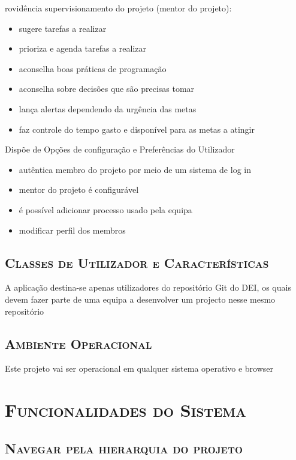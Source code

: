 \documentclass[12pt]{article}
\begin{document}
\hfill \linebreak

rovidência supervisionamento do projeto (mentor do projeto):
\begin{itemize}
\item sugere tarefas a realizar
\item prioriza e agenda tarefas a realizar
\item aconselha boas práticas de programação
\item aconselha sobre decisões que são precisas tomar
\item lança alertas dependendo da urgência das metas
\item faz controle do tempo gasto e disponível para as metas a atingir
\end{itemize}

Dispõe de Opções de configuração e Preferências do Utilizador
\begin{itemize}
\item autêntica membro do projeto por meio de um sistema de log in
\item mentor do projeto é configurável 
\item é possível adicionar processo usado pela equipa
\item modificar perfil dos membros
\end{itemize}

\subsection{ \textsc{Classes de Utilizador e Características}}
A aplicação destina-se apenas utilizadores do repositório Git do DEI, os quais devem fazer parte de uma equipa a desenvolver um projecto nesse mesmo repositório

\subsection{ \textsc{Ambiente Operacional}}
Este projeto vai ser operacional em qualquer sistema operativo e browser

\pagebreak

\section{ \textsc{Funcionalidades do Sistema}}
\subsection{ \textsc{Navegar pela hierarquia do projeto}}
\end{document}
